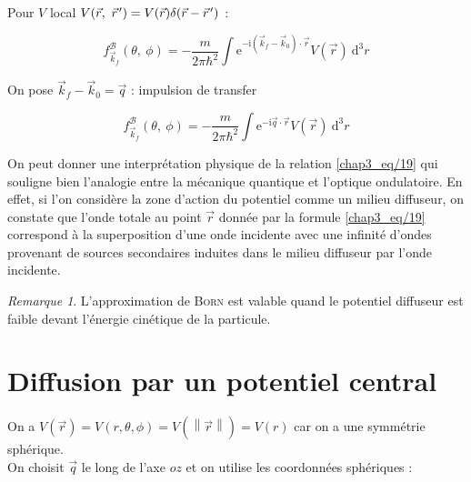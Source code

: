 \documentclass[12pt,a4paper,oneside,french]{book}
\renewcommand{\i}{\mathrm{i}}
\newcommand{\e}{\mathrm{e}}
\newcommand{\diff}{\mathrm{d}}
\newcommand{\pvec}[1]{\vec{#1} \mkern2mu \vphantom{#1}}
\theoremstyle{definition}
\theoremstyle{definition}
\theoremstyle{definition}
\theoremstyle{remark}
\newtheorem*{remark}{Remarque}
\theoremstyle{definition}
\begin{document}
    Pour $V$ local $V(\vec{r}, \ \pvec{r}') = V(\vec{r}) \delta(\vec{r} - \pvec{r}')$ :
    
    \begin{equation*}
        {f}_{{\vec{k}}_{f}}^{\mathcal{B}}(\theta, \ \phi) = -\frac{m}{2\pi {\hbar}^{2}} \int {\e}^{-\i \left({\vec{k}}_{f} - {\vec{k}}_{0}\right) \cdot \vec{r}} V(\vec{r}) \ {\diff}^{3} r
    \end{equation*}
    
    On pose ${\vec{k}}_{f} - {\vec{k}}_{0} = \vec{q}$ : impulsion de transfer
    
    \begin{equation*}
        {f}_{{\vec{k}}_{f}}^{\mathcal{B}}(\theta, \ \phi) = -\frac{m}{2\pi {\hbar}^{2}} \int {\e}^{-\i \vec{q} \cdot \vec{r}} V(\vec{r}) \ {\diff}^{3} r
    \end{equation*}
    
    On peut donner une interprétation physique de la relation \eqref{chap3_eq/19} qui souligne bien l'analogie entre la mécanique quantique et l'optique ondulatoire. En effet, si l'on considère la zone d'action du potentiel comme un milieu diffuseur, on constate que l'onde totale au point $\vec{r}$ donnée par la formule \eqref{chap3_eq/19} correspond à la superposition d'une onde incidente avec une infinité d'ondes provenant de sources secondaires induites dans le milieu diffuseur par l'onde incidente. \\
    
    \begin{remark}
        L'approximation de \textsc{Born} est valable quand le potentiel diffuseur est faible devant l'énergie cinétique de la particule.
    \end{remark}
    
    \section{Diffusion par un potentiel central}
    On a $V(\vec{r}) = V(r, \theta, \phi) = V(\left\lVert\vec{r}\right\rVert) = V(r)$ car on a une symmétrie sphérique. \\
    
    On choisit $\vec{q}$ le long de l'axe $oz$ et on utilise les coordonnées sphériques : 
    
\end{document}
